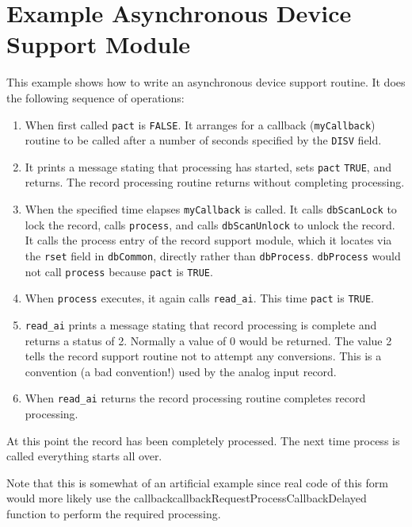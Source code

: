 \section{Example Asynchronous Device Support Module}

This example shows how to write an asynchronous device support routine. It does the following sequence of operations:

\begin{enumerate}\item When first called \verb|pact| is \verb|FALSE|. It arranges for a callback (\verb|myCallback|) routine to be called after a number of 
seconds specified by the \verb|DISV| field.

\item It prints a message stating that processing has started, sets \verb|pact| \verb|TRUE|, and returns. The record processing routine 
returns without completing processing.

\item When the specified time elapses \verb|myCallback| is called. It calls \verb|dbScanLock| to lock the record, calls \verb|process|, 
and calls \verb|dbScanUnlock| to unlock the record. It calls the process entry of the record support module, which it 
locates via the \verb|rset| field in \verb|dbCommon|, directly rather than \verb|dbProcess|. \verb|dbProcess| would not call \verb|process| 
because \verb|pact| is \verb|TRUE|. 

\item When \verb|process| executes, it again calls \verb|read_ai|. This time \verb|pact| is \verb|TRUE|.

\item \verb|read_ai| prints a message stating that record processing is complete and returns a status of 2. Normally a value of  
0 would be returned. The value 2 tells the record support routine not to attempt any conversions. This is a 
convention (a bad convention!) used by the analog input record.

\item When \verb|read_ai| returns the record processing routine completes record processing.

\end{enumerate}At this point the record has been completely processed. The next time process is called everything starts all over.

Note that this is somewhat of an artificial example since real code of this form would more likely use the 
callbackcallbackRequestProcessCallbackDelayed function to perform the required processing.

